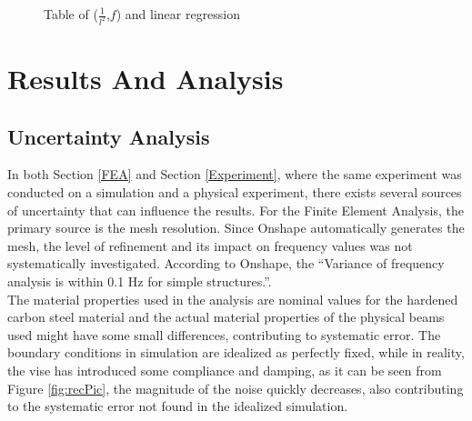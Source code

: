 \documentclass[a4paper,12pt]{article}
\begin{document}
    \begin{figure}[H]%
    \begin{center}

    \caption{Table of ($\frac{1}{l^{2}}$,$f$) and linear regression}\label{fig:EXPregression}
    \end{center}
    \end{figure}

\section{Results And Analysis}\label{ResultsAnalysis}%
    \subsection{Uncertainty Analysis}%
    In both Section \ref{FEA} and Section \ref{Experiment}, where the same experiment was conducted on a simulation and a physical experiment, there exists several sources of uncertainty that can influence the results.  For the Finite Element Analysis, the primary source is the mesh resolution. Since Onshape automatically generates the mesh, the level of refinement and its impact on frequency values was not systematically investigated. According to Onshape, the ``Variance of frequency analysis is within 0.1 Hz for simple structures.''\autocite{Onshape}.\\
    The  material properties used in the analysis are nominal values for the hardened carbon steel material and the actual material properties of the physical beams used might have some small differences, contributing to systematic error. The boundary conditions in simulation are idealized as perfectly fixed, while in reality, the vise has introduced some compliance and damping, as it can be seen from Figure \ref{fig:recPic}, the magnitude of the noise quickly decreases, also contributing to the systematic error not found in the idealized simulation.
\end{document}
